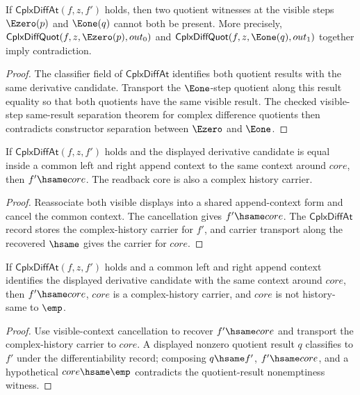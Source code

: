 \begin{theorem}
\label{thm:cplx-diff-at-visible-step-branches-absurd}
If $\mathsf{CplxDiffAt}(f,z,f')$ holds, then two quotient witnesses at the
visible steps $\Ezero(p)$ and $\Eone(q)$ cannot both be present. More
precisely, $\mathsf{CplxDiffQuot}(f,z,\Ezero(p),out_0)$ and
$\mathsf{CplxDiffQuot}(f,z,\Eone(q),out_1)$ together imply contradiction.
\end{theorem}
\begin{proof}
The classifier field of $\mathsf{CplxDiffAt}$ identifies both quotient results
with the same derivative candidate. Transport the $\Eone$-step quotient along
this result equality so that both quotients have the same visible result. The
checked visible-step same-result separation theorem for complex difference
quotients then contradicts constructor separation between $\Ezero$ and
$\Eone$.
\end{proof}

\begin{theorem}
\label{thm:cplx-diff-at-derivative-visible-context-readback}
If $\mathsf{CplxDiffAt}(f,z,f')$ holds and the displayed derivative candidate
is equal inside a common left and right append context to the same context
around $core$, then $f'\hsame core$. The readback core is also a complex
history carrier.
\end{theorem}
\begin{proof}
Reassociate both visible displays into a shared append-context form and cancel
the common context. The cancellation gives $f'\hsame core$. The
$\mathsf{CplxDiffAt}$ record stores the complex-history carrier for $f'$, and
carrier transport along the recovered $\hsame$ gives the carrier for $core$.
\end{proof}

\begin{theorem}
\label{thm:cplx-diff-at-derivative-visible-context-nonempty-readback}
If $\mathsf{CplxDiffAt}(f,z,f')$ holds and a common left and right append
context identifies the displayed derivative candidate with the same context
around $core$, then $f'\hsame core$, $core$ is a complex-history carrier, and
$core$ is not history-same to $\emp$.
\end{theorem}
\begin{proof}
Use visible-context cancellation to recover $f'\hsame core$ and transport the
complex-history carrier to $core$. A displayed nonzero quotient result $q$
classifies to $f'$ under the differentiability record; composing
$q\hsame f'$, $f'\hsame core$, and a hypothetical $core\hsame\emp$ contradicts
the quotient-result nonemptiness witness.
\end{proof}

